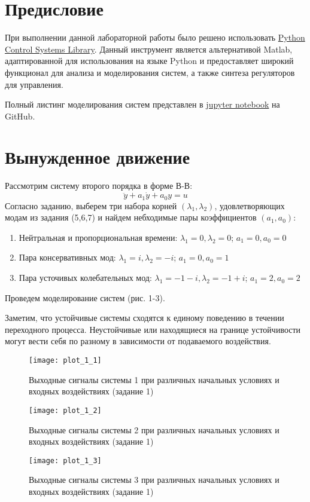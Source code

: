 \tableofcontents
\section*{Предисловие}
При выполнении данной лабораторной работы было решено использовать 
\href{https://python-control.readthedocs.io/en/0.9.4/}{Python Control Systems Library}.
Данный инструмент является альтернативой Matlab, адаптированной для использования на 
языке Python и предоставляет широкий функционал для анализа и моделирования систем,
а также синтеза регуляторов для управления.

Полный листинг моделирования систем представлен в \href{https://github.com/diuzhevVlad/control-theory-itmo-fall-2023/blob/main/Lab3/Lab3.ipynb}{jupyter notebook} на GitHub.

\pagebreak



\section{Вынужденное движение}
Рассмотрим систему второго порядка в форме В-В:
\begin{equation}
    \ddot{y} + a_1 \dot{y} + a_0 y  = u
\end{equation}
Согласно заданию, выберем три набора корней $(\lambda_1, \lambda_2)$, удовлетворяющих модам из задания (5,6,7)
и найдем небходимые пары коэффициентов $(a_1, a_0)$:
\begin{enumerate}
    \item Нейтральная и пропорциональная времени: $\lambda_1 = 0, \lambda_2 = 0$; $a_1 = 0, a_0 = 0$
    \item Пара консервативных мод: $\lambda_1 = i, \lambda_2 = -i$; $a_1 = 0, a_0 = 1$
    \item Пара усточивых колебательных мод: $\lambda_1 = -1 - i, \lambda_2 = -1 + i$; $a_1 = 2, a_0 = 2$
\end{enumerate}

Проведем моделирование систем (рис. 1-3).

Заметим, что устойчивые системы сходятся к единому поведению в течении переходного процесса.
Неустойчивые или находящиеся на границе устойчивости могут вести себя по разному в зависимости
от подаваемого воздействия.
\begin{figure}[h]
    \centering
    \texttt{[image: plot\_1\_1]}
    \caption{\label{fig:The-caption-1}Выходные сигналы системы 1 при различных начальных условиях и входных воздействиях (задание 1)}
\end{figure}
\begin{figure}[]
    \centering
    \texttt{[image: plot\_1\_2]}
    \caption{\label{fig:The-caption-1}Выходные сигналы системы 2 при различных начальных условиях и входных воздействиях (задание 1)}
\end{figure}
\begin{figure}[]
    \centering
    \texttt{[image: plot\_1\_3]}
    \caption{\label{fig:The-caption-1}Выходные сигналы системы 3 при различных начальных условиях и входных воздействиях (задание 1)}
\end{figure}
\pagebreak

